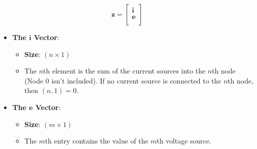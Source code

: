 \documentclass{article}
\begin{document}
\[
\mathbf{z} = 
\begin{bmatrix}
\mathbf{i} \\
\mathbf{e} \\
\end{bmatrix}
\]

\begin{itemize}
    \item \textbf{The $\mathbf{i}$ Vector}:
    \begin{itemize}
        \item \textbf{Size}: \( (n \times 1) \)
        \item The \(n\)th element is the sum of the current sources into the \(n\)th node (Node 0 isn't included). If no current source is connected to the \(n\)th node, then \((n, 1) = 0\).
    \end{itemize}
    \item \textbf{The $\mathbf{e}$ Vector}:
    \begin{itemize}
        \item \textbf{Size}: \( (m \times 1) \)
        \item The \(m\)th entry contains the value of the \(m\)th voltage source.
    \end{itemize}
\end{itemize}
\end{document}
